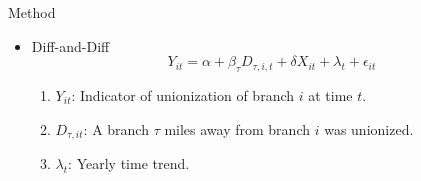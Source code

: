 \begin{frame}{Method}
\begin{itemize}
    \item Diff-and-Diff
\begin{equation*}
    Y_{it} = \alpha +  \beta_{\tau} D_{\tau, i,t} + \delta X_{it} + \lambda_t + \epsilon_{it}
\end{equation*}
\begin{enumerate}
    \item $Y_{it}$: Indicator of unionization of branch $i$ at time $t$. 
    \item $D_{\tau, it}$: A branch $\tau$ miles away from branch $i$ was unionized.
    \item $\lambda_t$: Yearly time trend.
\end{enumerate}
\end{itemize}
\end{frame}
